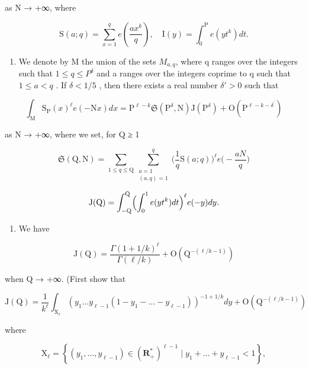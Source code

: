 as N → +∞, where

\[
\mathrm{S} (a; q) = \sum_ {x = 1} ^ {q} e \left(\frac {a x ^ {k}}{q}\right), \quad \mathrm{I} (y) = \int_ {0} ^ {\mathrm{P}} e \left(y t ^ {k}\right) d t.
\]

\begin{enumerate}
\def\labelenumi{\alph{enumi})}
\setcounter{enumi}{2}
\tightlist
\item
  We denote by M the union of the sets \(M_{a,q}\), where q ranges over the integers such that \(1 \leqslant q \leqslant P^{\delta}\) and a ranges over the integers coprime to q such that \(1 \leqslant a < q\) . If \(\delta < 1/5\) , then there exists a real number \(\delta' > 0\) such that
\end{enumerate}

\[
\int_ {\mathrm{M}} \mathrm{S} _ {\mathrm{P}} (x) ^ {\ell} e (- \mathrm{N} x) d x = \mathrm{P} ^ {\ell - k} \mathfrak {S} (\mathrm{P} ^ {\delta}, \mathrm{N}) \mathrm{J} (\mathrm{P} ^ {\delta}) + \mathrm{O} (\mathrm{P} ^ {\ell - k - \delta^ {\prime}})
\]

as N → +∞, where we set, for Q ≥ 1

\[
\mathfrak{S}(\mathrm{Q},\mathrm{N}) = \sum_{1\leqslant q\leqslant \mathrm{Q}}\sum_{\substack{a = 1\\ (a,q) = 1}}^{q}\Big(\frac{1}{q}\mathrm{S}(a;q)\Big)^{\ell}e\Big(-\frac{aN}{q}\Big)
\]

\[
\mathrm{J(Q)} = \int_ {- \mathrm{Q}} ^ {\mathrm{Q}} \Bigl (\int_ {0} ^ {1} e (y t ^ {k}) d t \Bigr) ^ {\ell} e (- y) d y.
\]

\begin{enumerate}
\def\labelenumi{\alph{enumi})}
\setcounter{enumi}{3}
\tightlist
\item
  We have
\end{enumerate}

\[
\mathrm{J} (\mathrm{Q}) = \frac {\Gamma (1 + 1 / k) ^ {\ell}}{\Gamma (\ell / k)} + \mathrm{O} (\mathrm{Q} ^ {- (\ell / k - 1)})
\]

when Q → +∞. (First show that

\[
\mathrm{J} (\mathrm{Q}) = \frac {1}{k ^ {\ell}} \int_ {\mathrm{X} _ {\ell}} (y _ {1} \dots y _ {\ell - 1} (1 - y _ {1} - \dots - y _ {\ell - 1})) ^ {- 1 + 1 / k} d y + \mathrm{O} (\mathrm{Q} ^ {- (\ell / k - 1)})
\]

where

\[
\mathrm{X} _ {\ell} = \left\{\left(y _ {1}, \dots , y _ {\ell - 1}\right) \in \left(\mathbf {R} _ {+} ^ {*}\right) ^ {\ell - 1} \mid y _ {1} + \dots + y _ {\ell - 1} <   1 \right\},
\]


